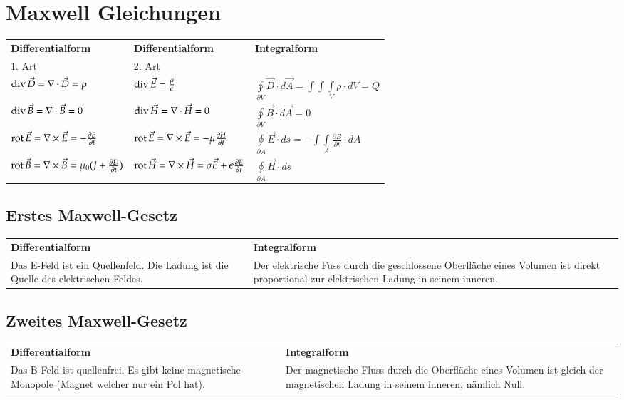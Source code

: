 \section{Maxwell Gleichungen}
\begin{longtable}{|p{} |p{}|p{}| }
	\hline
	\textbf{Differentialform} &\textbf{Differentialform} &\textbf{Integralform}\\
	1. Art & 2. Art &\\
	\hline
	$\operatorname{div} \vec{D}=\nabla \cdot \vec{D}= \rho$ & $\operatorname{div} \vec{E}= \frac{\rho}{\epsilon}$&$\oint\limits_{\partial V}\vec{D}\cdot d\vec{A}=\int\int\int\limits_{V}\rho \cdot dV=Q$\\
	\hline
	$\operatorname{div} \vec{B}=\nabla \cdot \vec{B}=0$&$\operatorname{div} \vec{H}=\nabla \cdot \vec{H}=0 $&$\oint\limits_{\partial V}\vec{B}\cdot d\vec{A}=0$\\
	\hline
	$\operatorname{rot} \vec{E}=\nabla \times \vec{E}=-\frac{\partial B}{\partial t}$&$\operatorname{rot} \vec{E}=\nabla \times \vec{E}=-\mu \frac{\partial H}{\partial t}$&$\oint\limits_{\partial A}\vec{E}\cdot ds=-\int\int\limits_{A}\frac{\partial B}{\partial t}\cdot dA$\\
	\hline
	$\operatorname{rot}\vec{B}=\nabla\times\vec{B}=\mu_0 (J+\frac{\partial D}{\partial t})$&$\operatorname{rot} \vec{H}=\nabla \times \vec{H}=\sigma\vec{E}+\epsilon \frac{\partial E}{\partial t}$&$\oint\limits_{\partial A} \vec{H}\cdot ds$\\
	\hline
\end{longtable}
\subsection{Erstes Maxwell-Gesetz}
\begin{tabular}{p{} p{}}
	\textbf{Differentialform}&\textbf{Integralform}\\
	Das E-Feld ist ein Quellenfeld. Die Ladung ist die Quelle des elektrischen Feldes. & Der elektrische Fuss durch die geschlossene Oberfläche eines Volumen ist direkt proportional zur elektrischen Ladung in seinem inneren. \\
\end{tabular}
\subsection{Zweites Maxwell-Gesetz}
\begin{tabular}{p{} p{}}
	\textbf{Differentialform}&\textbf{Integralform}\\
	Das B-Feld ist quellenfrei. Es gibt keine magnetische Monopole (Magnet welcher nur ein Pol hat).& Der magnetische Fluss durch die Oberfläche eines Volumen ist gleich der magnetischen Ladung in seinem inneren, nämlich Null.\\
\end{tabular}
